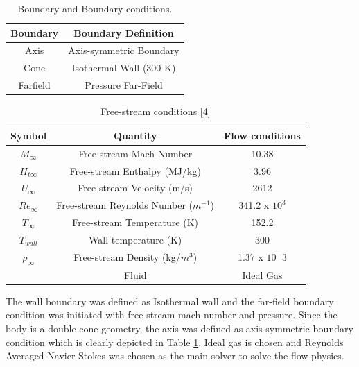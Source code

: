 \begin{table}[h!]
\centering
 \begin{tabular}{||c c||} 
 \hline
Boundary & Boundary Definition  \\ [0.5ex] 
 \hline\hline
 Axis & Axis-symmetric Boundary \\
 Cone & Isothermal Wall (300 K)  \\
 Farfield & Pressure Far-Field   \\
 \hline
 \end{tabular}
    \caption{ Boundary and Boundary conditions.}
  \label{fig:bc_definition}
\end{table}


\begin{table}[h!]
\centering
 \begin{tabular}{||c c c||} 
 \hline
Symbol & Quantity & Flow conditions \\ [0.5ex] 
 \hline\hline
 \(M_{\infty}\) & Free-stream Mach Number & 10.38  \\
 \(H_{t\infty}\) & Free-stream Enthalpy (MJ/kg) & 3.96  \\
 \(U_{\infty}\) & Free-stream Velocity (m/s) & 2612  \\
 \(Re_{\infty}\) & Free-stream Reynolds Number (\(m^{-1}\))& 341.2 x \(10^3\) \\
 \(T_{\infty}\) & Free-stream Temperature (K)& 152.2  \\
 \(T_{wall}\) & Wall temperature (K) & 300  \\
 \(\rho_{\infty}\) & Free-stream Density (kg/\(m^3\))& 1.37 x \(10^-3\)  \\
 & Fluid & Ideal Gas  \\
 \hline
 \end{tabular}
  \caption{ Free-stream conditions [4]}
 \label{fig:freestream_conditions}
\end{table}

The wall boundary was defined as Isothermal wall and the far-field boundary condition was initiated with free-stream mach number and pressure. Since the body is a double cone geometry, the axis was defined as axis-symmetric boundary condition which is clearly depicted in Table \ref{fig:bc_definition}. Ideal gas is chosen and Reynolds Averaged Navier-Stokes was chosen as the main solver to solve the flow physics. 